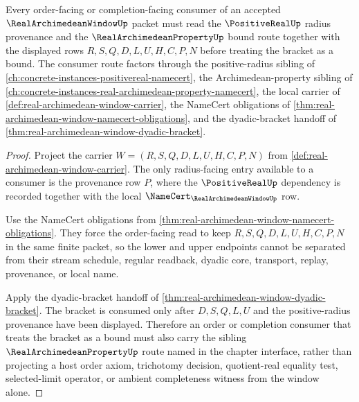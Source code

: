 \begin{theorem}
\label{thm:real-archimedean-window-bound-consumer-exactness}
Every order-facing or completion-facing consumer of an accepted $\RealArchimedeanWindowUp$ packet must read the $\PositiveRealUp$ radius provenance and the $\RealArchimedeanPropertyUp$ bound route together with the displayed rows $R,S,Q,D,L,U,H,C,P,N$ before treating the bracket as a bound. The consumer route factors through the positive-radius sibling of \autoref{ch:concrete-instances-positivereal-namecert}, the Archimedean-property sibling of \autoref{ch:concrete-instances-real-archimedean-property-namecert}, the local carrier of \autoref{def:real-archimedean-window-carrier}, the NameCert obligations of \autoref{thm:real-archimedean-window-namecert-obligations}, and the dyadic-bracket handoff of \autoref{thm:real-archimedean-window-dyadic-bracket}.
\end{theorem}
\begin{proof}
Project the carrier $W=(R,S,Q,D,L,U,H,C,P,N)$ from \autoref{def:real-archimedean-window-carrier}. The only radius-facing entry available to a consumer is the provenance row $P$, where the $\PositiveRealUp$ dependency is recorded together with the local $\NameCert_{\RealArchimedeanWindowUp}$ row.

Use the NameCert obligations from \autoref{thm:real-archimedean-window-namecert-obligations}. They force the order-facing read to keep $R,S,Q,D,L,U,H,C,P,N$ in the same finite packet, so the lower and upper endpoints cannot be separated from their stream schedule, regular readback, dyadic core, transport, replay, provenance, or local name.

Apply the dyadic-bracket handoff of \autoref{thm:real-archimedean-window-dyadic-bracket}. The bracket is consumed only after $D,S,Q,L,U$ and the positive-radius provenance have been displayed. Therefore an order or completion consumer that treats the bracket as a bound must also carry the sibling $\RealArchimedeanPropertyUp$ route named in the chapter interface, rather than projecting a host order axiom, trichotomy decision, quotient-real equality test, selected-limit operator, or ambient completeness witness from the window alone.
\end{proof}


